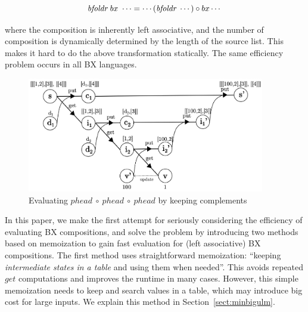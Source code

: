 \vspace{1mm}
\minusvspacetwo
 \[
 \mbox{\it bfoldr}~bx~\cdots = \cdots  (\mbox{\it bfoldr}~\cdots) \circ bx \cdots
 \]
 \minusvspacetwo

\noindent where the composition is inherently left associative, and the number of composition is dynamically determined by the length of the source list. This makes it hard to do the above transformation statically. The same efficiency problem occurs in all BX languages.



\begin{figure}[!t]
  \centering
  \includegraphics[height=5cm]{./fig/fig3.eps}
  \caption{Evaluating $phead \ \circ \ phead \ \circ \ phead$ by keeping complements}
  \label{fig:eval-comp-phead-2}
\end{figure}


In this paper, we make the first attempt for seriously considering the efficiency of evaluating BX compositions, and
solve the problem by introducing two methods based on memoization to gain fast evaluation for (left associative) BX compositions.
The first method uses straightforward memoization: ``keeping \emph{intermediate states in a table} and using them when needed''. This avoids repeated $get$ computations and improves the runtime in many cases. However, this simple memoization needs to keep and search values in a table, which may introduce big cost for large inputs. We explain this method in Section~\ref{sect:minbigulm}.

